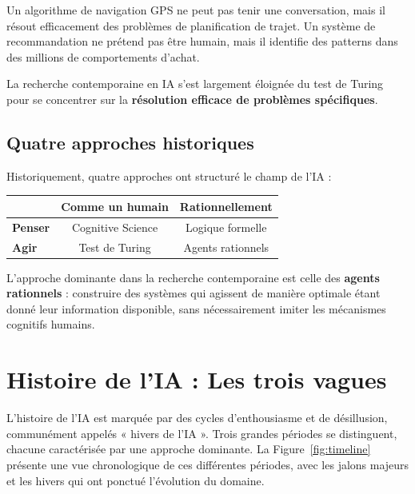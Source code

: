 \documentclass[11pt,a4paper]{article}
\begin{document}
\begin{exemplebox}
Un algorithme de navigation GPS ne peut pas tenir une conversation, mais il résout efficacement des problèmes de planification de trajet. Un système de recommandation ne prétend pas être humain, mais il identifie des patterns dans des millions de comportements d'achat.
\end{exemplebox}

La recherche contemporaine en IA s'est largement éloignée du test de Turing pour se concentrer sur la \textbf{résolution efficace de problèmes spécifiques}.

\subsection{Quatre approches historiques}

Historiquement, quatre approches ont structuré le champ de l'IA :

\begin{center}
\begin{tabular}{|l|c|c|}
\hline
& \textbf{Comme un humain} & \textbf{Rationnellement} \\
\hline
\textbf{Penser} & Cognitive Science & Logique formelle \\
\hline
\textbf{Agir} & Test de Turing & Agents rationnels \\
\hline
\end{tabular}
\end{center}

L'approche dominante dans la recherche contemporaine est celle des \textbf{agents rationnels} : construire des systèmes qui agissent de manière optimale étant donné leur information disponible, sans nécessairement imiter les mécanismes cognitifs humains.

\section{Histoire de l'IA : Les trois vagues}

L'histoire de l'IA est marquée par des cycles d'enthousiasme et de désillusion, communément appelés « hivers de l'IA ». Trois grandes périodes se distinguent, chacune caractérisée par une approche dominante. La Figure~\ref{fig:timeline} présente une vue chronologique de ces différentes périodes, avec les jalons majeurs et les hivers qui ont ponctué l'évolution du domaine.
\end{document}
